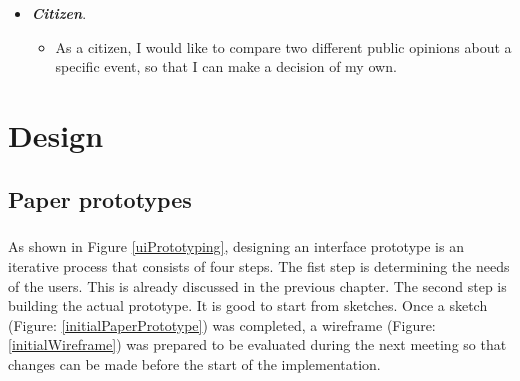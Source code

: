 \documentclass{l4proj}
\begin{document}
\begin{itemize}
	\item \textbf{\textit{Citizen}}.
	\begin{itemize}
		\item As a citizen, I would like to compare two different public opinions about a specific event, so that I can make a decision of my own. 
	\end{itemize}
\end{itemize}

\chapter{Design}

\section{Paper prototypes}
\label{sec:paper-prototypes}
\paragraph{}
As shown in Figure \ref{uiPrototyping}, designing an interface prototype is an iterative process that consists of four steps. The fist step is determining the needs of the users. This is already discussed in the previous chapter. The second step is building the actual prototype. It is good to start from sketches. Once a sketch (Figure: \ref{initialPaperPrototype}) was completed, a wireframe (Figure: \ref{initialWireframe}) was prepared to be evaluated during the next meeting so that changes can be made before the start of the implementation. 
\end{document}
